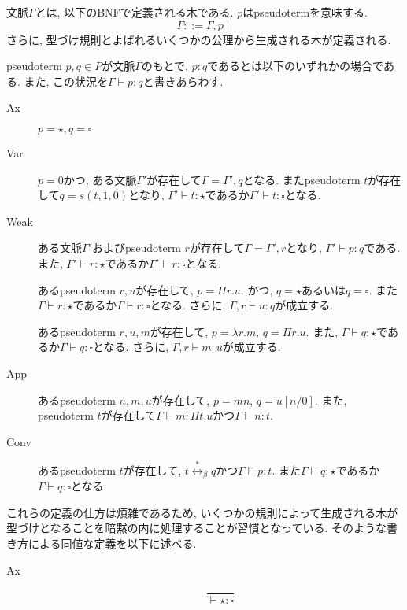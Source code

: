 \documentclass[12pt, titlepage]{ltjsarticle}
\begin{document}
\begin{defn}
 文脈$\Gamma$とは, 以下のBNFで定義される木である. $p$はpseudotermを意味する.
 \[
 \Gamma ::= \Gamma, p \mid
 \]
 さらに, 型づけ規則とよばれるいくつかの公理から生成される木が定義される.

 pseudoterm $p, q \in P$が文脈$\Gamma$のもとで, $p : q$であるとは以下のいずれかの場合である.
 また, この状況を$\Gamma \vdash p : q$と書きあらわす.
 \begin{description}
  \item[Ax] $p = {\star}, q = {\square}$
  \item[Var] $p = 0$かつ, ある文脈$\Gamma'$が存在して$\Gamma = \Gamma', q$となる. またpseudoterm $t$が存在して$q = s(t, 1, 0)$となり, $\Gamma' \vdash t : \star$であるか$\Gamma' \vdash t : \square$となる.
  \item[Weak] ある文脈$\Gamma'$およびpseudoterm $r$が存在して$\Gamma = \Gamma', r$となり, $\Gamma' \vdash p : q$である. また, $\Gamma' \vdash r : \star$であるか$\Gamma' \vdash r : \square$となる.
  \item[\Pi] あるpseudoterm $r, u$が存在して, $p = \Pi r. u$. かつ, $q = \star$あるいは$q = \square$. また$\Gamma \vdash r : \star$であるか$\Gamma \vdash r : \square$となる. さらに, $\Gamma, r \vdash u : q$が成立する.
  \item[\lambda] あるpseudoterm $r, u, m$が存在して, $p = \lambda r. m$, $q = \Pi r. u$. また, $\Gamma \vdash q : \star$であるか$\Gamma \vdash q : \square$となる. さらに, $\Gamma, r \vdash m : u$が成立する.
  \item[App] あるpseudoterm $n, m, u$が存在して, $p = m n$, $q = u[n/0]$. また, pseudoterm $t$が存在して$\Gamma \vdash m : \Pi t. u$かつ$\Gamma \vdash n : t$.
  \item[Conv] あるpseudoterm $t$が存在して, $t \overset{*}{\leftrightarrow}_\beta q$かつ$\Gamma \vdash p : t$. また$\Gamma \vdash q : \star$であるか$\Gamma \vdash q : \square$となる.
 \end{description}
 これらの定義の仕方は煩雑であるため, いくつかの規則によって生成される木が型づけとなることを暗黙の内に処理することが習慣となっている. そのような書き方による同値な定義を以下に述べる.
 \begin{description}
  \item[Ax] \[ \frac{}{\vdash {\star} {\colon} {\square}} \]

\end{description}
\end{defn}
\end{document}
